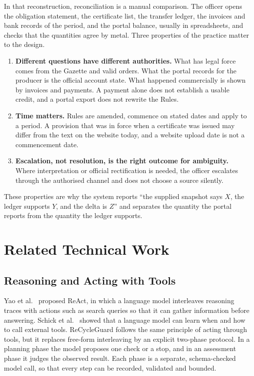 In that reconstruction, reconciliation is a manual comparison. The officer opens the obligation
statement, the certificate list, the transfer ledger, the invoices and bank records of the period, and
the portal balance, usually in spreadsheets, and checks that the quantities agree by metal. Three
properties of the practice matter to the design.
\begin{enumerate}[itemsep=2pt]
\item \textbf{Different questions have different authorities.} What has legal force comes from the
      Gazette and valid orders. What the portal records for the producer is the official account state.
      What happened commercially is shown by invoices and payments. A payment alone does not establish a
      usable credit, and a portal export does not rewrite the Rules.
\item \textbf{Time matters.} Rules are amended, commence on stated dates and apply to a period. A
      provision that was in force when a certificate was issued may differ from the text on the website
      today, and a website upload date is not a commencement date.
\item \textbf{Escalation, not resolution, is the right outcome for ambiguity.} Where interpretation or
      official rectification is needed, the officer escalates through the authorised channel and does not
      choose a source silently.
\end{enumerate}
These properties are why the system reports ``the supplied snapshot says $X$, the ledger supports $Y$,
and the delta is $Z$'' and separates the quantity the portal reports from the quantity the ledger supports.

\section{Related Technical Work}

\subsection{Reasoning and Acting with Tools}
Yao et al.~\cite{yao2023react} proposed ReAct, in which a language model interleaves reasoning traces with
actions such as search queries so that it can gather information before answering. Schick et
al.~\cite{schick2023toolformer} showed that a language model can learn when and how to call external
tools. ReCycleGuard follows the same principle of acting through tools, but it replaces free-form
interleaving by an explicit two-phase protocol. In a planning phase the model proposes one check or a
stop, and in an assessment phase it judges the observed result. Each phase is a separate, schema-checked
model call, so that every step can be recorded, validated and bounded.

